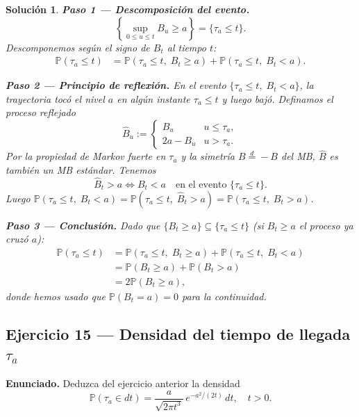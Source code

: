 \documentclass[12pt,letterpaper]{article}
\theoremstyle{ejercicio}
\theoremstyle{solucion}
\newtheorem*{solucion}{Solución}
\newcommand{\dto}{\overset{d}{=}}
\renewcommand{\P}{\mathbb{P}}
\begin{document}
\begin{solucion}

\textbf{Paso 1 — Descomposición del evento.}
\[
  \left\{\sup_{0\le u\le t}B_u\ge a\right\}
  = \{\tau_a\le t\}.
\]
Descomponemos según el signo de $B_t$ al tiempo $t$:
\begin{align*}
  \P(\tau_a\le t)
  &= \P(\tau_a\le t,\;B_t\ge a)+\P(\tau_a\le t,\;B_t<a).
\end{align*}

\textbf{Paso 2 — Principio de reflexión.}
En el evento $\{\tau_a\le t,\;B_t<a\}$, la trayectoria tocó el nivel $a$ en algún instante
$\tau_a\le t$ y luego bajó. Definamos el proceso reflejado
\[
  \hat{B}_u :=
  \begin{cases}
    B_u & u\le\tau_a,\\
    2a - B_u & u>\tau_a.
  \end{cases}
\]
Por la propiedad de Markov fuerte en $\tau_a$ y la simetría $B\dto -B$ del MB,
$\hat{B}$ es también un MB estándar. Tenemos
\[
  \hat{B}_t > a \iff B_t < a \quad\text{en el evento }\{\tau_a\le t\}.
\]
Luego $\P(\tau_a\le t,\;B_t<a)=\P(\tau_a\le t,\;\hat{B}_t>a)=\P(\tau_a\le t,\;B_t>a)$.

\textbf{Paso 3 — Conclusión.}
Dado que $\{B_t\ge a\}\subseteq\{\tau_a\le t\}$ (si $B_t\ge a$ el proceso ya cruzó $a$):
\begin{align*}
  \P(\tau_a\le t)
  &= \P(\tau_a\le t,\;B_t\ge a)+\P(\tau_a\le t,\;B_t<a)\\
  &= \P(B_t\ge a)+\P(B_t>a)\\
  &= 2\P(B_t\ge a),
\end{align*}
donde hemos usado que $\P(B_t=a)=0$ para la continuidad.
\end{solucion}

\subsection*{Ejercicio 15 — Densidad del tiempo de llegada $\tau_a$}

\begin{recuadro}
\textbf{Enunciado.} Deduzca del ejercicio anterior la densidad
\[
  \P(\tau_a\in dt)=\frac{a}{\sqrt{2\pi t^3}}\,e^{-a^2/(2t)}\,dt,\quad t>0.
\]
\end{recuadro}
\end{document}
